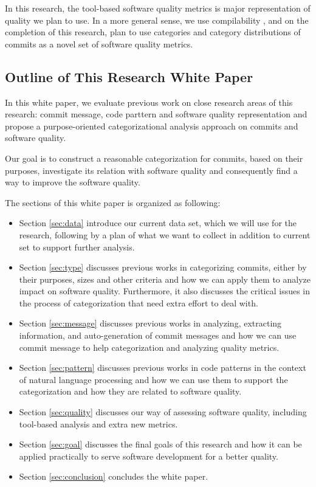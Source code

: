 In this research, the tool-based software quality metrics is major representation of quality we plan to use.
In a more general sense, we use compilability , and on the completion of this research, plan to use categories and category distributions of commits as a novel set of software quality metrics.


\subsection{Outline of This Research White Paper}
In this white paper, we evaluate previous work on close research areas of this research: commit message, code parttern and software quality representation and propose a purpose-oriented categorizational analysis approach on commits and software quality.

Our goal is to construct a reasonable categorization for commits, based on their purposes, investigate its relation with software quality and consequently find a way to improve the software quality.

The sections of this white paper is organized as following:
\begin{itemize}
    \item Section \ref{sec:data} introduce our current data set, which we will use for the research, following by a plan of what we want to collect in addition to current set to support further analysis.
    \item Section \ref{sec:type} discusses previous works in categorizing commits, either by their purposes, sizes and other criteria and how we can apply them to analyze impact on software quality. Furthermore, it also discusses the critical issues in the process of categorization that need extra effort to deal with.
    \item Section \ref{sec:message} discusses previous works in analyzing, extracting information, and auto-generation of commit messages  and how we can use commit message to help categorization and analyzing quality metrics.
    \item Section \ref{sec:pattern} discusses previous works in code patterns in the context of natural language processing and how we can use them to support the categorization and how they are related to software quality.
    \item Section \ref{sec:quality} discusses our way of assessing software quality, including tool-based analysis and extra new metrics.
    \item Section \ref{sec:goal} discusses the final goals of this research and how it can be applied practically to serve software development for a better quality.
    \item Section \ref{sec:conclusion} concludes the white paper.
\end{itemize}



